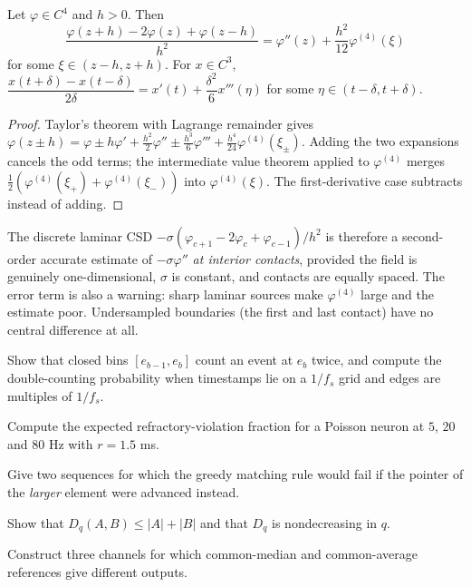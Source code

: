 \begin{theorem}\label{ars:fd-001}
Let $\varphi\in C^4$ and $h>0$. Then
\[\frac{\varphi(z+h)-2\varphi(z)+\varphi(z-h)}{h^2}=\varphi''(z)+\frac{h^2}{12}\varphi^{(4)}(\xi)\]
for some $\xi\in(z-h,z+h)$. For $x\in C^3$, $\dfrac{x(t+\delta)-x(t-\delta)}{2\delta}=x'(t)+\dfrac{\delta^2}{6}x'''(\eta)$ for some $\eta\in(t-\delta,t+\delta)$.
\end{theorem}
\begin{proof}
Taylor's theorem with Lagrange remainder gives $\varphi(z\pm h)=\varphi\pm h\varphi'+\tfrac{h^2}{2}\varphi''\pm\tfrac{h^3}{6}\varphi'''+\tfrac{h^4}{24}\varphi^{(4)}(\xi_\pm)$. Adding the two expansions cancels the odd terms; the intermediate value theorem applied to $\varphi^{(4)}$ merges $\tfrac12(\varphi^{(4)}(\xi_+)+\varphi^{(4)}(\xi_-))$ into $\varphi^{(4)}(\xi)$. The first-derivative case subtracts instead of adding.
\end{proof}
The discrete laminar CSD $-\sigma(\varphi_{c+1}-2\varphi_c+\varphi_{c-1})/h^2$ is therefore a second-order accurate estimate of $-\sigma\varphi''$ \emph{at interior contacts}, provided the field is genuinely one-dimensional, $\sigma$ is constant, and contacts are equally spaced. The error term is also a warning: sharp laminar sources make $\varphi^{(4)}$ large and the estimate poor. Undersampled boundaries (the first and last contact) have no central difference at all.

\begin{exercises}
\item Show that closed bins $[e_{b-1},e_b]$ count an event at $e_b$ twice, and compute the double-counting probability when timestamps lie on a $1/f_s$ grid and edges are multiples of $1/f_s$.
\item Compute the expected refractory-violation fraction for a Poisson neuron at $5$, $20$ and $80$ Hz with $r=1.5$ ms.
\item Give two sequences for which the greedy matching rule would fail if the pointer of the \emph{larger} element were advanced instead.
\item Show that $D_q(A,B)\le|A|+|B|$ and that $D_q$ is nondecreasing in $q$.
\item Construct three channels for which common-median and common-average references give different outputs.
\end{exercises}

